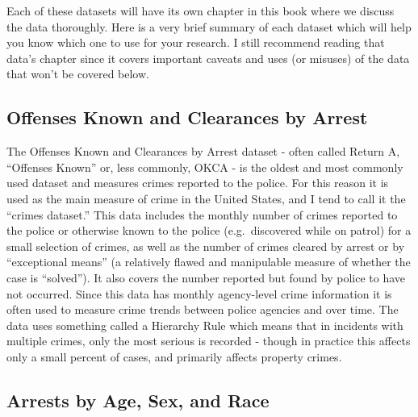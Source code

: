 \documentclass[
  12pt,
  openany]{book}
\begin{document}
Each of these datasets will have its own chapter in this book where we discuss the data thoroughly. Here is a very brief summary of each dataset which will help you know which one to use for your research. I still recommend reading that data's chapter since it covers important caveats and uses (or misuses) of the data that won't be covered below.

\hypertarget{offenses-known-and-clearances-by-arrest}{%
\subsection{Offenses Known and Clearances by Arrest}\label{offenses-known-and-clearances-by-arrest}}

The Offenses Known and Clearances by Arrest dataset - often called Return A, ``Offenses Known'' or, less commonly, OKCA - is the oldest and most commonly used dataset and measures crimes reported to the police. For this reason it is used as the main measure of crime in the United States, and I tend to call it the ``crimes dataset.'' This data includes the monthly number of crimes reported to the police or otherwise known to the police (e.g.~discovered while on patrol) for a small selection of crimes, as well as the number of crimes cleared by arrest or by ``exceptional means'' (a relatively flawed and manipulable measure of whether the case is ``solved''). It also covers the number reported but found by police to have not occurred. Since this data has monthly agency-level crime information it is often used to measure crime trends between police agencies and over time. The data uses something called a Hierarchy Rule which means that in incidents with multiple crimes, only the most serious is recorded - though in practice this affects only a small percent of cases, and primarily affects property crimes.

\hypertarget{arrests-by-age-sex-and-race}{%
\subsection{Arrests by Age, Sex, and Race}\label{arrests-by-age-sex-and-race}}
\end{document}
